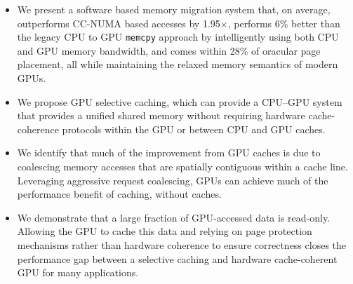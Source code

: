 \begin{itemize}

\item 
We present a software based memory migration system that, on average,
outperforms CC-NUMA based accesses by 1.95$\times$, performs 6\% better than the
legacy CPU to GPU {\tt memcpy} approach by intelligently using both CPU and GPU
memory bandwidth, and comes within 28\% of oracular page placement, all while
maintaining the relaxed memory semantics of modern GPUs.

\item
We propose GPU selective caching, which can provide a CPU--GPU system that
provides a unified shared memory without requiring hardware cache-coherence
protocols within the GPU or between CPU and GPU caches.

\item
We identify that much of the improvement from GPU caches is due to coalescing 
memory accesses that are spatially contiguous within a cache line.  Leveraging
aggressive request coalescing, GPUs can achieve much of the performance benefit
of caching, without caches.


\item
We demonstrate that a large fraction of GPU-accessed data is read-only. Allowing
the GPU to cache this data and relying on page protection mechanisms rather than
hardware coherence to ensure correctness closes the performance gap between a
selective caching and hardware cache-coherent GPU for many applications.
\end{itemize}

